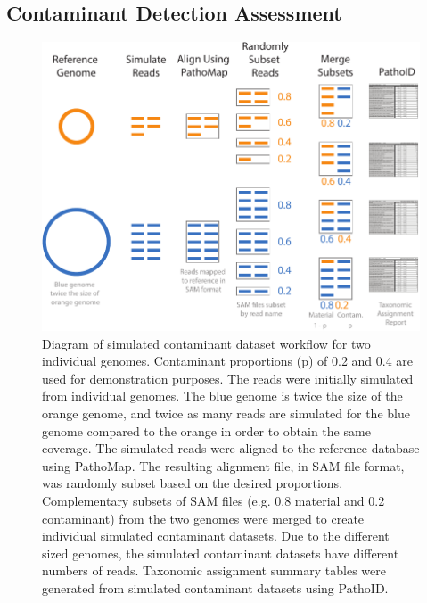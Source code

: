\documentclass[fleqn,10pt,lineno]{wlpeerj}\usepackage[]{graphicx}\usepackage[]{color}
\makeatletter
\def\maxwidth{ %
  \ifdim\Gin@nat@width>\linewidth
    \linewidth
  \else
    \Gin@nat@width
  \fi
}
\newenvironment{knitrout}{}{} %
\makeatother
\begin{document}
\subsection*{Contaminant Detection Assessment}

\begin{knitrout}
\color{fgcolor}\begin{figure}
\includegraphics[width=\maxwidth]{figure/contam_simulation} \caption[Diagram of simulated contaminant dataset workflow for two individual genomes]{Diagram of simulated contaminant dataset workflow for two individual genomes. Contaminant proportions (p) of 0.2 and 0.4 are used for demonstration purposes. The reads were initially simulated from individual genomes. The blue genome is twice the size of the orange genome, and twice as many reads are simulated for the blue genome compared to the orange in order to obtain the same coverage. The simulated reads were aligned to the reference database using PathoMap. The resulting alignment file, in SAM file format, was randomly subset based on the desired proportions. Complementary subsets of SAM files (e.g. 0.8 material and 0.2 contaminant) from the two genomes were merged to create individual simulated contaminant datasets.  Due to the different sized genomes, the simulated contaminant datasets have different numbers of reads. Taxonomic assignment summary tables were generated from simulated contaminant datasets using PathoID.}\label{fig:contam_simulation}
\end{figure}


\end{knitrout}
\end{document}
